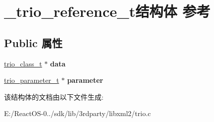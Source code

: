 \hypertarget{struct__trio__reference__t}{}\section{\+\_\+trio\+\_\+reference\+\_\+t结构体 参考}
\label{struct__trio__reference__t}
\subsection*{Public 属性}
\begin{DoxyCompactItemize}
\item 
\mbox{\label{struct__trio__reference__t_a3dfd30a4d069846237cfbb782026a0ab}} 
\hyperlink{struct__trio__class__t}{trio\+\_\+class\+\_\+t} $\ast$ {\bfseries data}
\item 
\mbox{\label{struct__trio__reference__t_a670d0e0313543e6a951fdc229a37ea79}} 
\hyperlink{structtrio__parameter__t}{trio\+\_\+parameter\+\_\+t} $\ast$ {\bfseries parameter}
\end{DoxyCompactItemize}


该结构体的文档由以下文件生成\+:\begin{DoxyCompactItemize}
\item 
E\+:/\+React\+O\+S-\/0../sdk/lib/3rdparty/libxml2/trio.\+c\end{DoxyCompactItemize}
